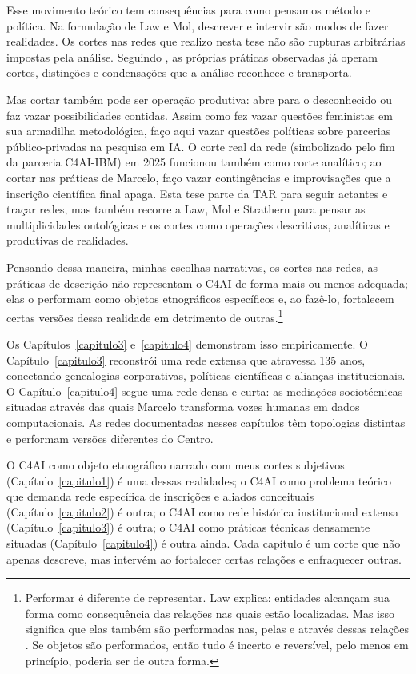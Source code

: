 Esse movimento teórico tem consequências para como pensamos método e política. Na formulação de Law e Mol, descrever e intervir são modos de fazer realidades. Os cortes nas redes que realizo nesta tese não são rupturas arbitrárias impostas pela análise. Seguindo \textcite{strathern2011cortando}, as próprias práticas observadas já operam cortes, distinções e condensações que a análise reconhece e transporta.

Mas cortar também pode ser operação produtiva: abre para o desconhecido ou faz vazar possibilidades contidas. Assim como \textcite{costa2024manchando} fez vazar questões feministas em sua armadilha metodológica, faço aqui vazar questões políticas sobre parcerias público-privadas na pesquisa em IA. O corte real da rede (simbolizado pelo fim da parceria C4AI-IBM) em 2025 funcionou também como corte analítico; ao cortar nas práticas de Marcelo, faço vazar contingências e improvisações que a inscrição científica final apaga. Esta tese parte da TAR para seguir actantes e traçar redes, mas também recorre a Law, Mol e Strathern para pensar as multiplicidades ontológicas e os cortes como operações descritivas, analíticas e produtivas de realidades.

Pensando dessa maneira, minhas escolhas narrativas, os cortes nas redes, as práticas de descrição não representam o C4AI de forma mais ou menos adequada; elas o performam como objetos etnográficos específicos e, ao fazê-lo, fortalecem certas versões dessa realidade em detrimento de outras.\footnote{Performar é diferente de representar. Law explica: entidades alcançam sua forma como consequência das relações nas quais estão localizadas. Mas isso significa que elas também são performadas nas, pelas e através dessas relações \parencite[p.~4]{LawHassard1999ANT}. Se objetos são performados, então tudo é incerto e reversível, pelo menos em princípio, poderia ser de outra forma.}

Os Capítulos~\ref{capitulo3} e~\ref{capitulo4} demonstram isso empiricamente. O Capítulo~\ref{capitulo3} reconstrói uma rede extensa que atravessa 135 anos, conectando genealogias corporativas, políticas científicas e alianças institucionais. O Capítulo~\ref{capitulo4} segue uma rede densa e curta: as mediações sociotécnicas situadas através das quais Marcelo transforma vozes humanas em dados computacionais. As redes documentadas nesses capítulos têm topologias distintas e performam versões diferentes do Centro.

O C4AI como objeto etnográfico narrado com meus cortes subjetivos (Capítulo~\ref{capitulo1}) é uma dessas realidades; o C4AI como problema teórico que demanda rede específica de inscrições e aliados conceituais (Capítulo~\ref{capitulo2}) é outra; o C4AI como rede histórica institucional extensa (Capítulo~\ref{capitulo3}) é outra; o C4AI como práticas técnicas densamente situadas (Capítulo~\ref{capitulo4}) é outra ainda. Cada capítulo é um corte que não apenas descreve, mas intervém ao fortalecer certas relações e enfraquecer outras.

